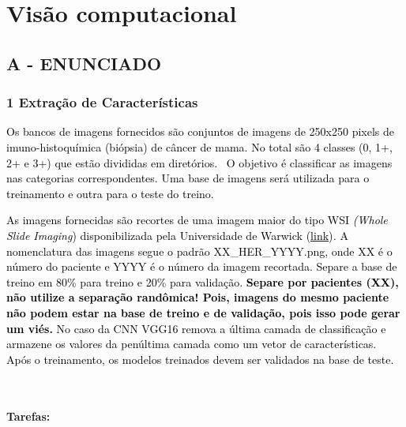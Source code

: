 \label{ap:ap11}
\chapter{Visão computacional}
\section*{\textbf{A - ENUNCIADO}}

\subsection*{\textbf{1 Extração de Características }}

\textcolor{black}{Os bancos de imagens fornecidos são conjuntos de imagens de 250x250 pixels de imuno-histoquímica
(biópsia) de câncer de mama. No total são 4 classes (0, 1+, 2+ e 3+) que estão divididas em diretórios.  O objetivo é
classificar as imagens nas categorias correspondentes. Uma base de imagens será utilizada para o treinamento e outra
para o teste do treino.}\textcolor{black}{ }

\textcolor{black}{As imagens fornecidas são recortes de uma imagem maior do tipo WSI }\textit{\textcolor{black}{(Whole
Slide Imaging}}\textcolor{black}{) disponibilizada pela Universidade de Warwick
(}\underline{\href{https://pubmed.ncbi.nlm.nih.gov/28771788/}{\textcolor{black}{link}}}\textcolor{black}{)}\textit{\textcolor{black}{.}}\textcolor{black}{ A nomenclatura das imagens
segue o padrão XX\_HER\_YYYY.png, onde XX é o número do paciente e YYYY é o número da imagem recortada. Separe a base
de treino em 80\% para treino e 20\% para validação. }\textbf{\textcolor{black}{Separe por pacientes (XX), não utilize
a separação randômica! Pois, imagens do mesmo paciente não podem estar na base de treino e de validação, pois isso pode
gerar um viés.}}\textcolor{black}{ No caso da CNN VGG16 remova a última camada de classificação e armazene os valores
da penúltima camada como um vetor de características. Após o treinamento, os modelos treinados devem ser validados na
base de teste.}\textcolor{black}{ }

\textcolor{black}{ }

\subsubsection*{Tarefas:}

